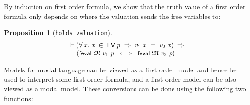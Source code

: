 \documentclass[letterpaper]{article}
\newtheorem{prop}{Proposition}
\renewcommand{\HOLConst}[1]{{\textsf{\upshape\small #1}}}
\newenvironment{holmath}{\begin{displaymath}\begin{array}{l}}{\end{array}\end{displaymath}\ignorespacesafterend}
\begin{document}
By induction on first order formula, we show that the truth value of a first order formula only depends on where the valuation sends the free variables to:
\begin{prop}[\texttt{holds_valuation}]
\begin{holmath}
  \ensuremath{\HOLTokenTurnstile}(\HOLSymConst{\HOLTokenForall{}}\HOLBoundVar{x}.\;\HOLBoundVar{x}\;\HOLSymConst{\HOLTokenIn{}}\;\HOLConst{FV}\;\HOLFreeVar{p}\;\HOLSymConst{\HOLTokenImp{}}\;\HOLFreeVar{v\sb{\mathrm{1}}}\;\HOLBoundVar{x}\;\HOLSymConst{=}\;\HOLFreeVar{v\sb{\mathrm{2}}}\;\HOLBoundVar{x})\;\HOLSymConst{\HOLTokenImp{}}\\
\;\;\;\;\;(\HOLConst{feval}\;\HOLFreeVar{\ensuremath{\mathfrak{M}}}\;\HOLFreeVar{v\sb{\mathrm{1}}}\;\HOLFreeVar{p}\;\HOLSymConst{\HOLTokenEquiv{}}\;\HOLConst{feval}\;\HOLFreeVar{\ensuremath{\mathfrak{M}}}\;\HOLFreeVar{v\sb{\mathrm{2}}}\;\HOLFreeVar{p})
\end{holmath}
\end{prop}

Models for modal language can be viewed as a first order model and hence be used to interpret some first order formula, and a first order model can be also viewed as a modal model. These conversions can be done using the following two functions:
\end{document}
